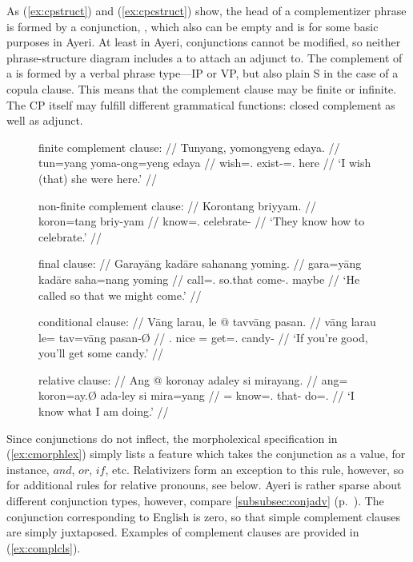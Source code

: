 As (\ref{ex:cpstruct}) and (\ref{ex:cpcstruct}) show, the head of a
complementizer phrase is formed by a conjunction, , which also can be
empty and is for some basic purposes in Ayeri. At least in Ayeri, conjunctions
cannot be modified, so neither phrase-structure diagram includes a  to
attach an adjunct to. The complement of a  is formed by a verbal
phrase type---IP or VP, but also plain S in the case of a copula clause. This
means that the complement clause may be finite or infinite. The CP itself may
fulfill different grammatical functions: closed complement as well as
adjunct.

\begin{figure}
\pex\label{ex:complcls}
\a\label{ex:complcls_1}\begingl
	\glpreamble finite complement clause: //
	\gla Tunyang, yomongyeng edaya. //
	\glb tun=yang yoma-ong=yeng edaya //
	\glc wish=\Fsg{}.\Aarg{} exist-\Irr{}=\Fsg{}.\Aarg{} here //
	\glft `I wish (that) she were here.' //
\endgl

\a\label{ex:complcls_2}\begingl
	\glpreamble non-finite complement clause: //
	\gla Korontang briyyam. //
	\glb koron=tang briy-yam //
	\glc know=\TplM{}.\Aarg{} celebrate-\Ptcp{} //
	\glft `They know how to celebrate.' //
\endgl

\a\label{ex:complcls_3}\begingl
	\glpreamble final clause: //
	\gla Garayāng kadāre sahanang yoming. //
	\glb gara=yāng kadāre saha=nang yoming //
	\glc call=\TsgM{}.\Aarg{} so.that come-\Fpl{}.\Aarg{} maybe //
	\glft `He called so that we might come.' //
\endgl

\a\label{ex:complcls_4}\begingl
	\glpreamble conditional clause: //
	\gla Vāng larau, le @ tavvāng pasan. //
	\glb vāng larau le= tav=vāng pasan-Ø //
	\glc \Second{}.\Aarg{} nice \PatT{}= get=\Second{}.\Aarg{} candy-\Top{} //
	\glft `If you're good, you'll get some candy.' //
\endgl

\a\label{ex:complcls_5}\begingl
	\glpreamble relative clause: //
	\gla Ang @ koronay adaley si mirayang. //
	\glb ang= koron=ay.Ø ada-ley si mira=yang //
	\glc \AgtT{}= know=\Fsg{}.\Top{} that-\PargI{} \Rel{} do=\Fsg{}.\Aarg{} //
	\glft `I know what I am doing.' //
\endgl

\xe
\end{figure}

Since conjunctions do not inflect, the morpholexical specification in
(\ref{ex:cmorphlex}) simply lists a \Conj{} feature which takes the conjunction
as a value, for instance, $and$, $or$, $if$, etc. Relativizers form an
exception to this rule, however, so for additional rules for relative pronouns,
see below. Ayeri is rather sparse about different conjunction types, however,
compare \autoref{subsubsec:conjadv} (p.~\pageref{subsubsec:conjadv}). The
conjunction corresponding to English  is zero, so that simple
complement clauses are simply juxtaposed. Examples of complement clauses are
provided in (\ref{ex:complcls}).

